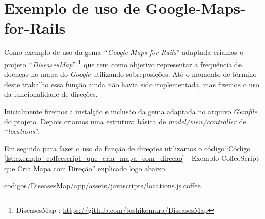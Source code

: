 \section{Exemplo de uso de Google-Maps-for-Rails}
\label{section:exemplo_de_uso_de_google-maps-for-rails}

Como exemplo de uso da gema ‘‘\emph{Google-Maps-for-Rails}'' adaptada criamos o projeto 
‘‘\emph{\href{https://github.com/toshikomura/DiseasesMap}{DiseasesMap}}'' 
\footnote{DiseasesMap : \url{https://github.com/toshikomura/DiseasesMap}} que tem como objetivo representar 
a frequência de doenças no mapa do \emph{Google} utilizando sobreposições. Até o momento de término deste
trabalho essa função ainda não havia sido implementada, mas fizemos o uso da funcionalidade de direções.

Inicialmente fizemos a instalção e inclusão da gema adaptada no arquivo \emph{Gemfile} do projeto. Depois 
criamos uma estrutura básica de \emph{model/view/controller} de ‘‘\emph{locations}''. 

Em seguida para fazer o uso da função de direções utilizamos o código‘‘Código 
\ref{lst:exemplo_coffeescript_que_cria_mapa_com_direcao} - Exemplo CoffeeScript que Cria Mapa com 
Direção'' explicado logo abaixo.


{codigos/DiseasesMap/app/assets/javascripts/locations.js.coffee}


